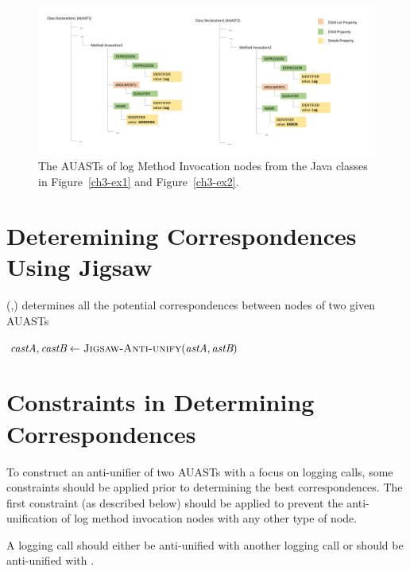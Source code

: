 \begin{figure} [H]
  \centering\includegraphics [width = \textwidth, height = 0.4\textheight]
  {Drawing4/structure1.pdf}
  \caption{The AUASTs of log Method Invocation nodes from the Java classes in Figure~\ref{ch3-ex1} and Figure~\ref{ch3-ex2}.}
  \label{fig:constructAUast}
\end{figure}


\section{Deteremining Correspondences Using Jigsaw} \label{meth-CAST}
 
\begin{algorithm}
\caption{(,) determines all the potential correspondences between nodes of two given AUASTs}
\label{overview}
\begin{algorithmic}[1]
\JigsawCorr
{}	
	\State  $\textit{castA},\textit{castB} \gets \textsc{Jigsaw-Anti-unify}(\textit{astA},\textit{astB})$
\EndFor	
\EndFor    
\end{algorithmic}
\end{algorithm}




\section{Constraints in Determining Correspondences}  \label{meth-constraints}
To construct an anti-unifier of two AUASTs with a focus on logging calls, some constraints should be applied prior to determining the best correspondences. The first constraint (as described below) should be applied to prevent the anti-unification of log method invocation nodes with any other type of node.
\begin{constraint}
A logging call should either be anti-unified with another logging call or should be anti-unified with \nothing.
\end{constraint}	
	
